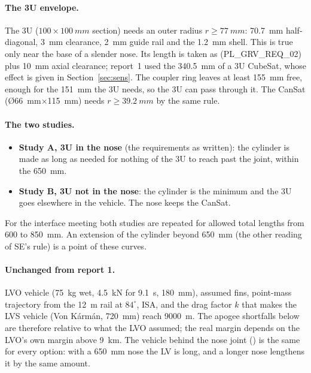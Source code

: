 \paragraph{The 3U envelope.} The 3U ($100\times\SI{100}{mm}$ section) needs an outer radius
$r\geq\SI{77}{mm}$: \SI{70.7}{mm} half-diagonal, \SI{3}{mm} clearance, \SI{2}{mm} guide rail and
the \SI{1.2}{mm} shell. This is true only near the base of a slender nose. Its length is taken as
\TLGRVLEN{} (PL\_GRV\_REQ\_02) plus \SI{10}{mm} axial clearance; report~1 used the
\SI{340.5}{mm} of a 3U CubeSat, whose effect is given in Section~\ref{sec:sens}. The coupler ring
leaves at least \SI{155}{mm} free, enough for the \SI{151}{mm} the 3U needs, so the 3U can pass
through it. The CanSat (\O\SI{66}{mm}$\times$\SI{115}{mm}) needs $r\geq\SI{39.2}{mm}$ by the same
rule.

\paragraph{The two studies.}
\begin{itemize}[leftmargin=*,itemsep=1pt]
\item \textbf{Study A, 3U in the nose} (the requirements as written): the cylinder is made as long as
needed for nothing of the 3U to reach past the joint, within the \SI{650}{mm}.
\item \textbf{Study B, 3U not in the nose}: the cylinder is the \TLCMIN{} minimum and the 3U goes
elsewhere in the vehicle. The nose keeps the CanSat.
\end{itemize}
For the interface meeting both studies are repeated for allowed total lengths from 600 to
\SI{850}{mm}. An extension of the cylinder beyond \SI{650}{mm} (the other reading of SE's rule) is a
point of these curves.

\paragraph{Unchanged from report 1.} LVO vehicle (\SI{75}{kg} wet, \SI{4.5}{kN} for \SI{9.1}{s},
\SI{180}{mm}), assumed fins, point-mass trajectory from the \SI{12}{m} rail at $84^\circ$, ISA, and
the drag factor $k$ that makes the LVS vehicle (Von K\'arm\'an, \SI{720}{mm}) reach \SI{9000}{m}.
The apogee shortfalls below are therefore relative to what the LVO assumed; the real margin depends
on the LVO's own margin above \SI{9}{km}. The vehicle behind the nose joint (\TLREST) is the same for
every option: with a \SI{650}{mm} nose the LV is \TLLVSIX{} long, and a longer nose lengthens it by
the same amount.
